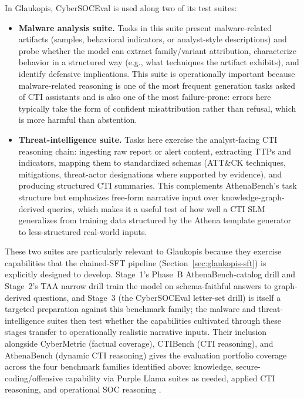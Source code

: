 \documentclass[unnumsec,webpdf,contemporary,large]{oup-authoring-template}
\theoremstyle{thmstyleone}
\theoremstyle{thmstyletwo}
\theoremstyle{thmstylethree}
\begin{document}
In Glaukopis, CyberSOCEval is used along two of its test suites:

\begin{itemize}
  \item \textbf{Malware analysis suite.} Tasks in this suite present malware-related artifacts (samples, behavioral indicators, or analyst-style descriptions) and probe whether the model can extract family/variant attribution, characterize behavior in a structured way (e.g., what techniques the artifact exhibits), and identify defensive implications. This suite is operationally important because malware-related reasoning is one of the most frequent generation tasks asked of CTI assistants and is also one of the most failure-prone: errors here typically take the form of confident misattribution rather than refusal, which is more harmful than abstention.
  \item \textbf{Threat-intelligence suite.} Tasks here exercise the analyst-facing CTI reasoning chain: ingesting raw report or alert content, extracting TTPs and indicators, mapping them to standardized schemas (ATT\&CK techniques, mitigations, threat-actor designations where supported by evidence), and producing structured CTI summaries. This complements AthenaBench's task structure but emphasizes free-form narrative input over knowledge-graph-derived queries, which makes it a useful test of how well a CTI SLM generalizes from training data structured by the Athena template generator to less-structured real-world inputs.
\end{itemize}

These two suites are particularly relevant to Glaukopis because they exercise capabilities that the chained-SFT pipeline (Section~\ref{sec:glaukopis-sft}) is explicitly designed to develop. Stage~1's Phase~B AthenaBench-catalog drill and Stage~2's TAA narrow drill train the model on schema-faithful answers to graph-derived questions, and Stage~3 (the CyberSOCEval letter-set drill) is itself a targeted preparation against this benchmark family; the malware and threat-intelligence suites then test whether the capabilities cultivated through these stages transfer to operationally realistic narrative inputs. Their inclusion alongside CyberMetric (factual coverage), CTIBench (CTI reasoning), and AthenaBench (dynamic CTI reasoning) gives the evaluation portfolio coverage across the four benchmark families identified above: knowledge, secure-coding/offensive capability via Purple Llama suites as needed, applied CTI reasoning, and operational SOC reasoning \cite{tihanyi2024cybermetric,alam2024ctibench,alam2025athenabench,bhatt2023purplellama,bhatt2024cyberseceval2,cybersoceval2025}.
\end{document}
